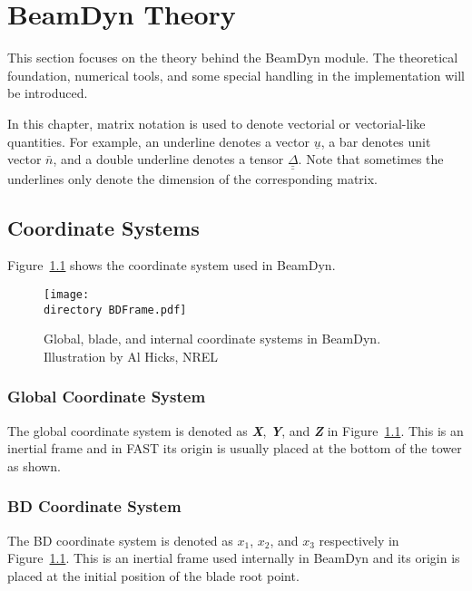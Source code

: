 \chapter{BeamDyn Theory}

This section focuses on the theory behind the BeamDyn module. The theoretical foundation, numerical tools, and some special handling in the implementation will be introduced. 

In this chapter, matrix notation is used to denote vectorial or vectorial-like quantities. For example, an underline denotes a vector $\underline{u}$, a bar denotes unit vector $\bar{n}$, and a double underline denotes a tensor $\underline{\underline{\Delta}}$. Note that sometimes the underlines only denote the dimension of the corresponding matrix.

\section{Coordinate Systems}
Figure~\ref{fig:BDFrame}  shows the coordinate system used in BeamDyn.
\begin{figure}
    \centering
    \texttt{[image: \\directory BDFrame.pdf]}
    \caption{Global, blade, and internal coordinate systems in BeamDyn. Illustration by Al Hicks, NREL}
    \label{fig:BDFrame}
\end{figure}

\subsection{Global Coordinate System}
The global coordinate system is denoted as \textbf{ {\it X}}, \textbf{ {\it Y}}, and \textbf{ {\it Z}} in Figure~\ref{fig:BDFrame}. This is an inertial frame and in FAST its origin is usually placed at the bottom of the tower as shown.

\subsection{BD Coordinate System}
The BD coordinate system is denoted as $x_1$, $x_2$, and $x_3$ respectively in Figure~\ref{fig:BDFrame}. This is an inertial frame used internally in BeamDyn and its origin is placed at the initial position of the blade root point.


